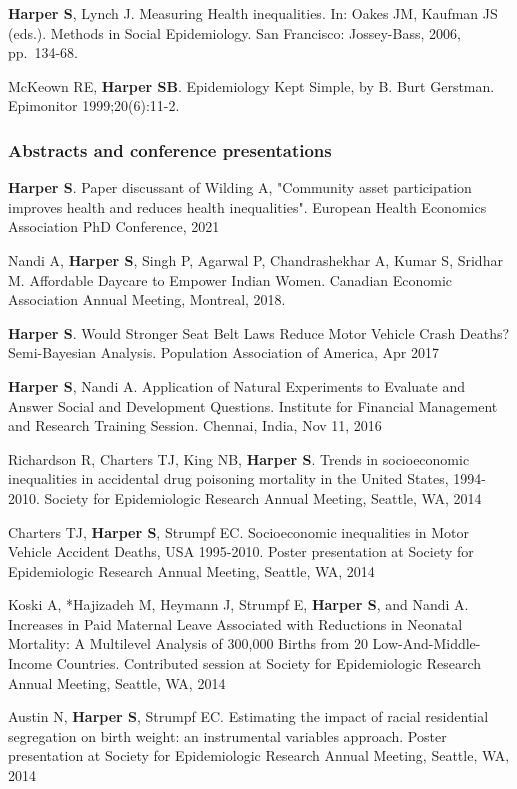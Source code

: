 \documentclass[
  letterpaper,
  DIV=11,
  numbers=noendperiod]{scrartcl}
\begin{document}
\textbf{Harper S}, Lynch J. Measuring Health inequalities. In: Oakes JM,
Kaufman JS (eds.). Methods in Social Epidemiology. San Francisco:
Jossey-Bass, 2006, pp.~134-68.

McKeown RE, \textbf{Harper SB}. Epidemiology Kept Simple, by B. Burt
Gerstman. Epimonitor 1999;20(6):11-2.

\subsubsection{Abstracts and conference
presentations}\label{abstracts-and-conference-presentations}

\textbf{Harper S}. Paper discussant of Wilding A, "Community asset
participation improves health and reduces health inequalities". European
Health Economics Association PhD Conference, 2021

Nandi A, \textbf{Harper S}, Singh P, Agarwal P, Chandrashekhar A, Kumar
S, Sridhar M. Affordable Daycare to Empower Indian Women. Canadian
Economic Association Annual Meeting, Montreal, 2018.

\textbf{Harper S}. Would Stronger Seat Belt Laws Reduce Motor Vehicle
Crash Deaths? Semi-Bayesian Analysis. Population Association of America,
Apr 2017

\textbf{Harper S}, Nandi A. Application of Natural Experiments to
Evaluate and Answer Social and Development Questions. Institute for
Financial Management and Research Training Session. Chennai, India, Nov
11, 2016

Richardson R, Charters TJ, King NB, \textbf{Harper S}. Trends in
socioeconomic inequalities in accidental drug poisoning mortality in the
United States, 1994-2010. Society for Epidemiologic Research Annual
Meeting, Seattle, WA, 2014

Charters TJ, \textbf{Harper S}, Strumpf EC. Socioeconomic inequalities
in Motor Vehicle Accident Deaths, USA 1995-2010. Poster presentation at
Society for Epidemiologic Research Annual Meeting, Seattle, WA, 2014

Koski A, *Hajizadeh M, Heymann J, Strumpf E, \textbf{Harper S}, and
Nandi A. Increases in Paid Maternal Leave Associated with Reductions in
Neonatal Mortality: A Multilevel Analysis of 300,000 Births from 20
Low-And-Middle-Income Countries. Contributed session at Society for
Epidemiologic Research Annual Meeting, Seattle, WA, 2014

Austin N, \textbf{Harper S}, Strumpf EC. Estimating the impact of racial
residential segregation on birth weight: an instrumental variables
approach. Poster presentation at Society for Epidemiologic Research
Annual Meeting, Seattle, WA, 2014
\end{document}

